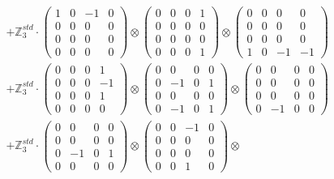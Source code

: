 \documentclass{article}
\begin{document}
{\begin{align}
        &+ \label{Rs12-Rc12-Solution-1-c20} \mathbb{Z}_3^{std} \cdot 
            \begin{pmatrix} 1 & 0 & -1 & 0 \\ 0 & 0 & 0 & 0 \\ 0 & 0 & 0 & 0 \\ 0 & 0 & 0 & 0 \end{pmatrix} \otimes 
            \begin{pmatrix} 0 & 0 & 0 & 1 \\ 0 & 0 & 0 & 0 \\ 0 & 0 & 0 & 0 \\ 0 & 0 & 0 & 1 \end{pmatrix} \otimes 
            \begin{pmatrix} 0 & 0 & 0 & 0 \\ 0 & 0 & 0 & 0 \\ 0 & 0 & 0 & 0 \\ 1 & 0 & -1 & -1 \end{pmatrix} \\ 
        &+ \label{Rs12-Rc12-Solution-1-c21} \mathbb{Z}_3^{std} \cdot 
            \begin{pmatrix} 0 & 0 & 0 & 1 \\ 0 & 0 & 0 & -1 \\ 0 & 0 & 0 & 1 \\ 0 & 0 & 0 & 0 \end{pmatrix} \otimes 
            \begin{pmatrix} 0 & 0 & 0 & 0 \\ 0 & -1 & 0 & 1 \\ 0 & 0 & 0 & 0 \\ 0 & -1 & 0 & 1 \end{pmatrix} \otimes 
            \begin{pmatrix} 0 & 0 & 0 & 0 \\ 0 & 0 & 0 & 0 \\ 0 & 0 & 0 & 0 \\ 0 & -1 & 0 & 0 \end{pmatrix} \\ 
        &+ \label{Rs12-Rc12-Solution-1-c22} \mathbb{Z}_3^{std} \cdot 
            \begin{pmatrix} 0 & 0 & 0 & 0 \\ 0 & 0 & 0 & 0 \\ 0 & -1 & 0 & 1 \\ 0 & 0 & 0 & 0 \end{pmatrix} \otimes 
            \begin{pmatrix} 0 & 0 & -1 & 0 \\ 0 & 0 & 0 & 0 \\ 0 & 0 & 0 & 0 \\ 0 & 0 & 1 & 0 \end{pmatrix} \otimes 

\end{align}}
\end{document}
